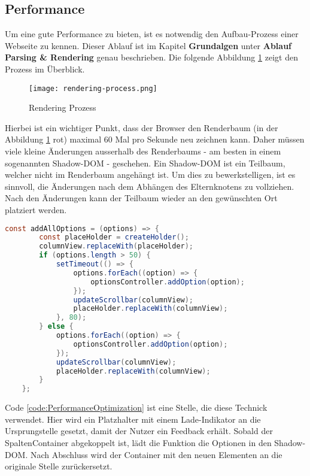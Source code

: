 \subsection{Performance}

Um eine gute Performance zu bieten, ist es notwendig den Aufbau-Prozess einer Webseite zu kennen.
Dieser Ablauf ist im Kapitel \textbf{Grundalgen} unter \textbf{Ablauf Parsing \& Rendering} genau beschrieben.
Die folgende Abbildung \ref{Abbildung:RenderingProcessRecap} zeigt den Prozess im Überblick.

\begin{figure}[!htb]
    \centering
    \texttt{[image: rendering-process.png]}
    \caption{Rendering Prozess}
    \label{Abbildung:RenderingProcessRecap}
\end{figure}

Hierbei ist ein wichtiger Punkt, dass der Browser den Renderbaum (in der Abbildung \ref{Abbildung:RenderingProcessRecap} rot) maximal 60 Mal pro Sekunde neu zeichnen kann.
Daher müssen viele kleine Änderungen ausserhalb des Renderbaums - am besten in einem sogenannten Shadow-DOM - geschehen.
Ein Shadow-DOM ist ein Teilbaum, welcher nicht im Renderbaum angehängt ist.
Um dies zu bewerkstelligen, ist es sinnvoll, die Änderungen nach dem Abhängen des Elternknotens zu vollziehen. 
Nach den Änderungen kann der Teilbaum wieder an den gewünschten Ort platziert werden.

\begin{lstlisting}[language = java, caption = Code: Performance Optimierung (columnOptionsComponent.js), label = code:PerformanceOptimization]
    const addAllOptions = (options) => {
        const placeHolder = createHolder();
        columnView.replaceWith(placeHolder);
        if (options.length > 50) {
            setTimeout(() => {
                options.forEach((option) => {
                    optionsController.addOption(option);
                });
                updateScrollbar(columnView);
                placeHolder.replaceWith(columnView);
            }, 80);
        } else {
            options.forEach((option) => {
                optionsController.addOption(option);
            });
            updateScrollbar(columnView);
            placeHolder.replaceWith(columnView);
        }
    };
\end{lstlisting}

Code \ref{code:PerformanceOptimization} ist eine Stelle, die diese Technick verwendet.
Hier wird ein Platzhalter mit einem Lade-Indikator an die Ursprungstelle gesetzt, damit der Nutzer ein Feedback erhält.
Sobald der SpaltenContainer abgekoppelt ist, lädt die Funktion die Optionen in den Shadow-DOM.
Nach Abschluss wird der Container mit den neuen Elementen an die originale Stelle zurückersetzt.


